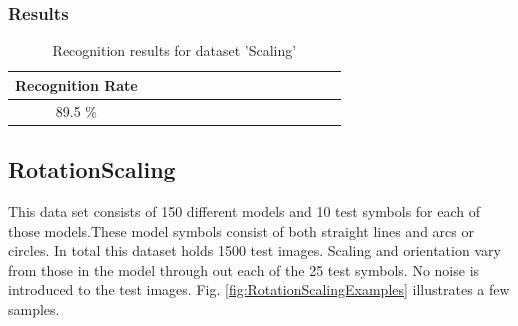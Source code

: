 \subsubsection{Results}
\begin{table}[H]
\centering
\caption{Recognition results for dataset 'Scaling'}
\begin{tabular}{ccccccccccccccc}
  \hline
      Recognition Rate \\
  \hline
      89.5 \% \\
  \hline
\end{tabular}
\end{table}
\vspace{85mm}

\subsection{RotationScaling}    
This data set consists of 150 different models and 10 test symbols for each of those models.These model symbols consist of both straight lines and arcs or circles. In total this dataset holds 1500 test images. Scaling and orientation vary from those in the model through out each of the 25 test symbols. No noise is introduced to the test images. Fig. \ref{fig:RotationScalingExamples} illustrates a few samples.

